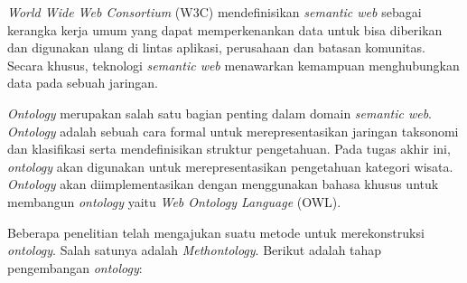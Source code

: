 \textit{World Wide Web Consortium} (W3C) mendefinisikan \textit{semantic web} sebagai kerangka kerja umum yang dapat memperkenankan data untuk bisa diberikan dan digunakan ulang di lintas aplikasi, perusahaan dan batasan komunitas. Secara khusus, teknologi \textit{semantic web} menawarkan kemampuan menghubungkan data pada sebuah jaringan.
\par
\textit{Ontology} merupakan salah satu bagian penting dalam domain \textit{semantic web}. \textit{Ontology} adalah sebuah cara formal untuk merepresentasikan jaringan taksonomi dan klasifikasi serta mendefinisikan struktur pengetahuan. Pada tugas akhir ini, \textit{ontology} akan digunakan untuk merepresentasikan pengetahuan kategori wisata. \textit{Ontology} akan diimplementasikan dengan menggunakan bahasa khusus untuk membangun \textit{ontology} yaitu \textit{Web Ontology Language} (OWL).
\par
Beberapa penelitian telah mengajukan suatu metode untuk merekonstruksi \textit{ontology}. Salah satunya adalah \textit{Methontology}\cite{jones1998methodologies}. 
Berikut adalah tahap pengembangan \textit{ontology}\cite{fernandez1997methontology}:

